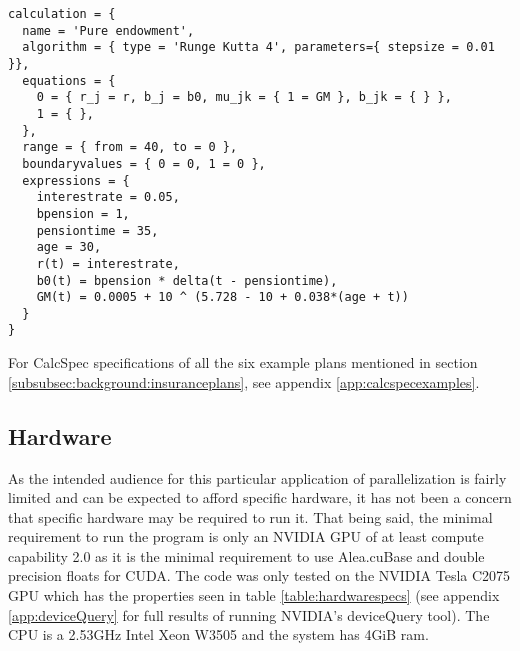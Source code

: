\begin{lstlisting}[caption=The pure endowment insurance plan expressed in CalcSpec, label=pe_calcspec, language=calcspec]
calculation = {
  name = 'Pure endowment',
  algorithm = { type = 'Runge Kutta 4', parameters={ stepsize = 0.01 }},
  equations = { 
    0 = { r_j = r, b_j = b0, mu_jk = { 1 = GM }, b_jk = { } },
    1 = { },
  },
  range = { from = 40, to = 0 },
  boundaryvalues = { 0 = 0, 1 = 0 },
  expressions = {
    interestrate = 0.05,
    bpension = 1,
    pensiontime = 35,
    age = 30,
    r(t) = interestrate,
    b0(t) = bpension * delta(t - pensiontime),
    GM(t) = 0.0005 + 10 ^ (5.728 - 10 + 0.038*(age + t))
  }
}
\end{lstlisting}

For CalcSpec specifications of all the six example plans mentioned in section \ref{subsubsec:background:insuranceplans}, see appendix \ref{app:calcspecexamples}.

\subsection{Hardware}\label{subsec:background:hardware}
As the intended audience for this particular application of parallelization is fairly limited and can be expected to afford specific hardware, it has not been a concern that specific hardware may be required to run it.
That being said, the minimal requirement to run the program is only an NVIDIA GPU of at least compute capability 2.0 as it is the minimal requirement to use Alea.cuBase and double precision floats for CUDA.
The code was only tested on the NVIDIA Tesla C2075 GPU which has the properties seen in table \ref{table:hardwarespecs} (see appendix \ref{app:deviceQuery} for full results of running NVIDIA's deviceQuery tool).
The CPU is a 2.53GHz Intel Xeon W3505 and the system has 4GiB ram.


